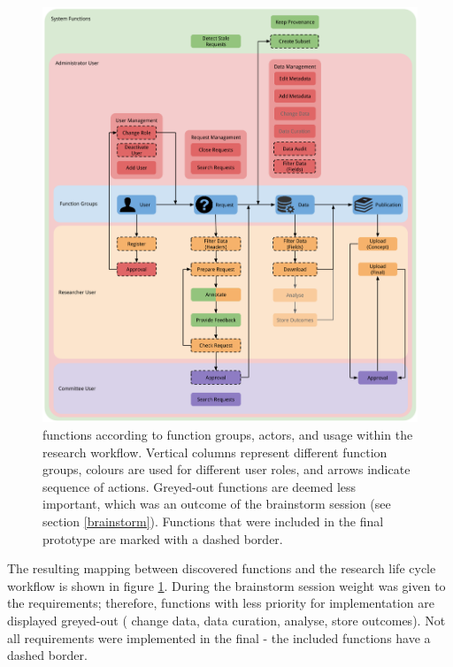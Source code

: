 \begin{figure}[!htb]
	\centering
	\includegraphics[width=1.0\linewidth]{images/functions-in-workflow}
	\caption{
		\ivfsystem{} functions according to function groups, actors, and usage within the research workflow.
		Vertical columns represent different function groups, colours are used for different user roles, and arrows indicate sequence of actions.
		Greyed-out functions are deemed less important, which was an outcome of the brainstorm session (see section \ref{brainstorm}).
		Functions that were included in the final prototype are marked with a dashed border.
	}
	\label{fig:functions-workflow}
\end{figure}

\noindent{}The resulting mapping between discovered \ivfsystem{} functions and the research life cycle workflow is shown in figure \ref{fig:functions-workflow}.
During the brainstorm session weight was given to the requirements; therefore, functions with less priority for  implementation are displayed greyed-out (\ie{} change data, data curation, analyse, store outcomes).
Not all requirements were implemented in the final \ivfprototype{} - the included functions  have a dashed border.